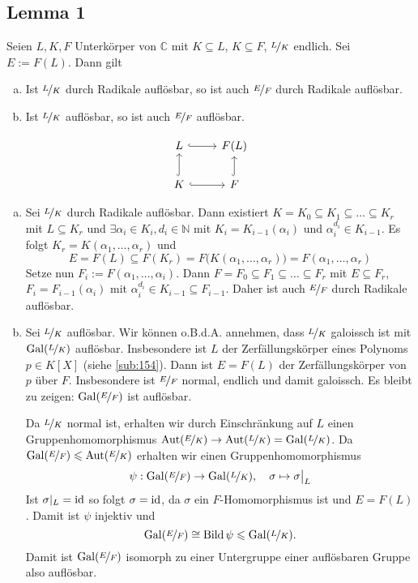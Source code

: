 \subsection[Lemma 1: Auflösbarkeit in einem kommutierenden Diagramm]{Lemma 1} %
\label{sub:217}
\begin{minipage}{0.95\textwidth}
	Seien $L,K,F$ Unterkörper von $\mathds{C}$ mit $K \subseteq L$, $K \subseteq F$, $\nicefrac{L}{K}$ endlich. Sei $E := F(L)$. Dann gilt
	\begin{enumerate}[a)]
		\item Ist $\nicefrac{L}{K}$ durch Radikale auflösbar, so ist auch $\nicefrac{E}{F}$ durch Radikale auflösbar.
		\item Ist $\nicefrac{L}{K}$ auflösbar, so ist auch $\nicefrac{E}{F}$ auflösbar.
	\end{enumerate}
\end{minipage}
\begin{minipage}{0.1\textwidth}
	\[
		\begin{tikzcd}
			L \rar[hook]&  F(L)\\
			K \uar[hook] \rar[hook] & F \uar[hook]
		\end{tikzcd}
	\]
\end{minipage}
\begin{enumerate}[a)]
	\item Sei $\nicefrac{L}{K}$ durch Radikale auflösbar. Dann existiert $K= K_0 \subseteq K_1 \subseteq \ldots \subseteq K_r$ mit 
	$L \subseteq K_r$ und $\exists \alpha_i \in K_i, d_i \in \mathds{N}$ mit $K_i= K_{i-1}(\alpha_i)$ und $\alpha_i^{d_i} \in K_{i-1}$.
	Es folgt $K_r = K(\alpha_1, \ldots , \alpha_r)$ und
	\[
		E=F(L) \subseteq F(K_r) = F\big(K(\alpha_1, \ldots , \alpha_r)\big) = F(\alpha_1, \ldots , \alpha_r)
	\]
	Setze nun $F_i := F(\alpha_1, \ldots , \alpha_i)$. Dann $F=F_0 \subseteq F_1 \subseteq \ldots \subseteq F_r$ mit $E \subseteq F_r$, $F_i = F_{i-1}(\alpha_i)$ mit
	$\alpha_i^{d_i} \in K_{i-1} \subseteq F_{i-1}$. Daher ist auch $\nicefrac{E}{F}$ durch Radikale auflösbar.
	\item Sei $\nicefrac{L}{K}$ auflösbar. Wir können o.B.d.A. annehmen, dass $\nicefrac{L}{K}$ galoissch ist mit $\operatorname{Gal}(\nicefrac{L}{K})$ auflösbar. Insbesondere ist 
	$L$ der Zerfällungskörper eines Polynoms $p \in K[X]$ (siehe \ref{sub:154}). Dann ist $E=F(L)$ der Zerfällungskörper von $p$ über $F$. Insbesondere ist 
	$\nicefrac{E}{F}$ normal, endlich und damit galoissch. Es bleibt zu zeigen: $\operatorname{Gal}(\nicefrac{E}{F})$ ist auflösbar.
	
	Da $\nicefrac{L}{K}$ normal ist, erhalten wir durch Einschränkung auf $L$ einen Gruppenhomomorphismus 
	$\operatorname{Aut} (\nicefrac{E}{K}) \to\operatorname{Aut}(\nicefrac{L}{K}) = \operatorname{Gal}(\nicefrac{L}{K})$. Da $\operatorname{Gal}(\nicefrac{E}{F}) \leqslant \operatorname{Aut}(\nicefrac{E}{K})$ erhalten wir einen Gruppenhomomorphismus
	\[
		\psi : \operatorname{Gal}(\nicefrac{E}{F}) \to \operatorname{Gal}(\nicefrac{L}{K}), \quad \sigma \mapsto \sigma\big|_L
	\]
	Ist $\sigma|_L = \operatorname{id}$ so folgt $\sigma= \operatorname{id}$, da $\sigma$ ein $F$-Homomorphismus ist und $E=F(L)$. Damit ist $\psi$ injektiv und 
	\[
		\operatorname{Gal}(\nicefrac{E}{F}) \cong \operatorname{Bild} \psi \leqslant \operatorname{Gal}(\nicefrac{L}{K}).
	\]
	Damit ist $\operatorname{Gal}(\nicefrac{E}{F})$ isomorph zu einer Untergruppe einer auflösbaren Gruppe also auflösbar.\bewende
\end{enumerate}
